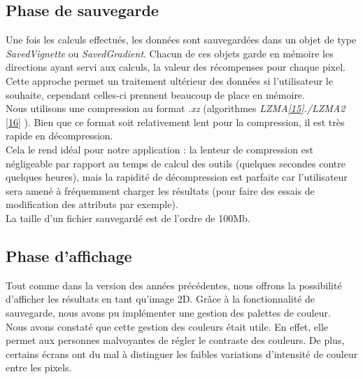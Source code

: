 \documentclass[12pt]{article}
\begin{document}
\subsection{Phase de sauvegarde}

Une fois les calculs effectués, les données sont sauvegardées dans un objet de type \emph{SavedVignette} ou \emph{SavedGradient}. Chacun de ces objets garde en mémoire les directions ayant servi aux calculs, la valeur des récompenses pour chaque pixel. \\

Cette approche permet un traitement ultérieur des données si l'utilisateur le souhaite, cependant celles-ci prennent beaucoup de place en mémoire. \\

Nous utilisons une compression au format \emph{.xz} (algorithmes \emph{LZMA\href{https://fr.wikipedia.org/wiki/LZMA}{[15]}./LZMA2} \href{https://en.wikipedia.org/wiki/Lempel%E2%80%93Ziv%E2%80%93Markov_chain_algorithm}{[16]}
). Bien que ce format soit relativement lent pour la compression, il est très rapide en décompression. \\

Cela le rend idéal pour notre application : la lenteur de compression est négligeable par rapport au temps de calcul des outils (quelques secondes contre quelques heures), mais la rapidité de décompression est parfaite car l'utilisateur sera amené à fréquemment charger les résultats (pour faire des essais de modification des attributs par exemple). \\

La taille d'un fichier sauvegardé est de l'ordre de 100Mb. \\

\subsection{Phase d'affichage}
\label{sec:affichage}

Tout comme dans la version des années précédentes, nous offrons la possibilité d'afficher les résultats en tant qu'image 2D. Grâce à la fonctionnalité de sauvegarde, nous avons pu implémenter une gestion des palettes de couleur. \\

Nous avons constaté que cette gestion des couleurs était utile. En effet, elle permet aux personnes malvoyantes de régler le contraste des couleurs. De plus, certains écrans ont du mal à distinguer les faibles variations d'intensité de couleur entre les pixels. \\
\end{document}

